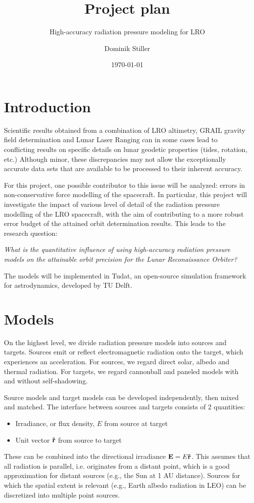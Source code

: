 \documentclass[parskip=full,DIV=15]{scrartcl}
\title{Project plan}
\subtitle{High-accuracy radiation pressure modeling for LRO}
\author{Dominik Stiller}
\date{\today}
\begin{document}
\maketitle


\printnomenclature

\section{Introduction}
Scientific results obtained from a combination of LRO altimetry, GRAIL gravity field determination and Lunar Laser Ranging can in some cases lead to conflicting results on specific details on lunar geodetic properties (tides, rotation, etc.) Although minor, these discrepancies may not allow the exceptionally accurate data sets that are available to be processed to their inherent accuracy.

For this project, one possible contributor to this issue will be analyzed: errors in non-conservative force modelling of the spacecraft. In particular, this project will investigate the impact of various level of detail of the radiation pressure modelling of the LRO spacecraft, with the aim of contributing to a more robust error budget of the attained orbit determination results. This leads to the research question:
\begin{displayquote}\textit{
   What is the quantitative influence of using high-accuracy radiation pressure models on the attainable orbit precision for the Lunar Reconaissance Orbiter?
}\end{displayquote}

The models will be implemented in Tudat, an open-source simulation framework for astrodynamics, developed by TU Delft.





\section{Models}\label{sec:models}
On the highest level, we divide radiation pressure models into sources and targets. Sources emit or reflect electromagnetic radiation onto the target, which experiences an acceleration. For sources, we regard direct solar, albedo and thermal radiation. For targets, we regard cannonball and paneled models with and without self-shadowing.

Source models and target models can be developed independently, then mixed and matched. The interface between sources and targets consists of 2 quantities:
\begin{itemize}
   \item Irradiance, or flux density, $E$ from source at target
   \item Unit vector $\vu r$ from source to target
\end{itemize}
These can be combined into the directional irradiance $\vb E=E \vu r$. This assumes that all radiation is parallel, i.e. originates from a distant point, which is a good approximation for distant sources (e.g., the Sun at 1 AU distance). Sources for which the spatial extent is relevant (e.g., Earth albedo radiation in LEO) can be discretized into multiple point sources.
\end{document}
